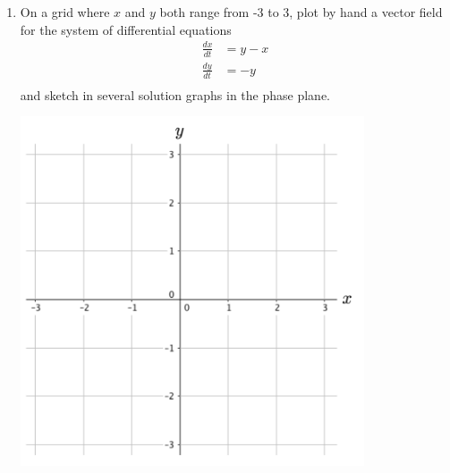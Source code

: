 \begin{enumerate}[resume]
\item	On a grid where $x$ and $y$ both range from -3 to 3, plot by hand a vector field for the system of differential equations \label{09problem9}
\begin{align*}
	\frac{dx}{dt} &= y-x\\
	\frac{dy}{dt} &= -y\\
\end{align*}
   and sketch in several solution graphs in the phase plane. 
\begin{center}
	\includegraphics[width=4in]{11/11VectorField1.png}\\
\end{center}
\vfill
 

\end{enumerate}
